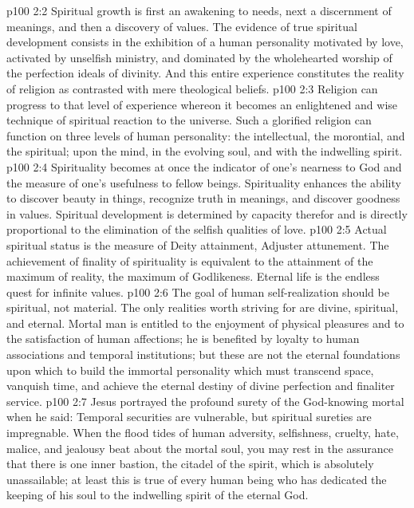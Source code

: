 \vs p100 2:2 Spiritual growth is first an awakening to needs, next a discernment of meanings, and then a discovery of values. The evidence of true spiritual development consists in the exhibition of a human personality motivated by love, activated by unselfish ministry, and dominated by the wholehearted worship of the perfection ideals of divinity. And this entire experience constitutes the reality of religion as contrasted with mere theological beliefs.
\vs p100 2:3 Religion can progress to that level of experience whereon it becomes an enlightened and wise technique of spiritual reaction to the universe. Such a glorified religion can function on three levels of human personality: the intellectual, the morontial, and the spiritual; upon the mind, in the evolving soul, and with the indwelling spirit.
\vs p100 2:4 \pc Spirituality becomes at once the indicator of one’s nearness to God and the measure of one’s usefulness to fellow beings. Spirituality enhances the ability to discover beauty in things, recognize truth in meanings, and discover goodness in values. Spiritual development is determined by capacity therefor and is directly proportional to the elimination of the selfish qualities of love.
\vs p100 2:5 Actual spiritual status is the measure of Deity attainment, Adjuster attunement. The achievement of finality of spirituality is equivalent to the attainment of the maximum of reality, the maximum of Godlikeness. Eternal life is the endless quest for infinite values.
\vs p100 2:6 \pc The goal of human self\hyp{}realization should be spiritual, not material. The only realities worth striving for are divine, spiritual, and eternal. Mortal man is entitled to the enjoyment of physical pleasures and to the satisfaction of human affections; he is benefited by loyalty to human associations and temporal institutions; but these are not the eternal foundations upon which to build the immortal personality which must transcend space, vanquish time, and achieve the eternal destiny of divine perfection and finaliter service.
\vs p100 2:7 Jesus portrayed the profound surety of the God\hyp{}knowing mortal when he said:  Temporal securities are vulnerable, but spiritual sureties are impregnable. When the flood tides of human adversity, selfishness, cruelty, hate, malice, and jealousy beat about the mortal soul, you may rest in the assurance that there is one inner bastion, the citadel of the spirit, which is absolutely unassailable; at least this is true of every human being who has dedicated the keeping of his soul to the indwelling spirit of the eternal God.
